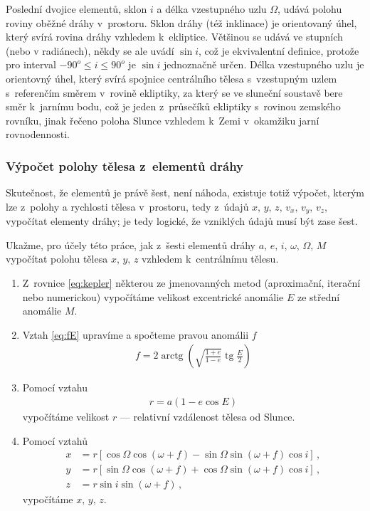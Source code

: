 \documentclass[A4paper, 12pt, oneside]{book}%
\DeclareMathOperator{\tg}{tg}
\DeclareMathOperator{\arctg}{arctg}
\begin{document}
Poslední dvojice elementů, sklon $i$ a délka vzestupného uzlu $\Omega$, udává polohu roviny oběžné dráhy v~prostoru. Sklon dráhy (též inklinace) je orientovaný úhel, který svírá rovina dráhy vzhledem k~ekliptice. Většinou se udává ve stupních (nebo v radiánech), někdy se ale uvádí $\sin i$, což je ekvivalentní definice, protože pro interval $-90^o\leq i \leq 90^o$ je $\sin i$ jednoznačně určen. Délka vzestupného uzlu je orientovný úhel, který svírá spojnice centrálního tělesa s~vzestupným uzlem s~referenčím směrem v~rovině ekliptiky, za který se ve sluneční soustavě bere směr k~jarnímu bodu, což je jeden z~průsečíků ekliptiky s~rovinou zemského rovníku, jinak řečeno poloha Slunce vzhledem k~Zemi v~okamžiku jarní rovnodennosti.

\subsubsection{Výpočet polohy tělesa z~elementů dráhy}
Skutečnost, že elementů je právě šest, není náhoda, existuje totiž výpočet, kterým lze z~polohy a rychlosti tělesa v~prostoru, tedy z~údajů $x,\, y,\, z,\, v_x,\, v_y,\, v_z$, vypočítat elementy dráhy; je tedy logické, že vzniklých údajů musí být zase šest. 

Ukažme, pro účely této práce, jak z~šesti elementů dráhy $a,\,e,\,i,\,\omega,\,\Omega,\,M$ vypočítat polohu tělesa $x,\, y,\, z$ vzhledem k~centrálnímu tělesu.

\begin{enumerate}[label=\arabic*.]
	\item Z~rovnice \eqref{eq:kepler} některou ze jmenovanných metod (aproximační, iterační nebo numerickou) vypočítáme velikost excentrické anomálie $E$ ze střední anomálie $M$.
	\item Vztah \eqref{eq:fE} upravíme a spočteme pravou anomálii $f$
		\begin{align}
			f = 2\arctg\left(\sqrt{\frac{1+e}{1-e}}\tg \frac{E}{2}\right)
		\end{align}
	\item Pomocí vztahu 
		\begin{align}
			r=a(1-e\cos E)
		\end{align}
		vypočítáme velikost $r$ --- relativní vzdálenost tělesa od Slunce.
	\item Pomocí vztahů
		\begin{align}
			x&=r\left[\cos\Omega\cos(\omega+f)-\sin\Omega\sin(\omega+f)\cos i\right]\,, \\
			y&=r\left[\sin\Omega\cos(\omega+f)+\cos\Omega\sin(\omega+f)\cos i\right]\,, \\
			z&=r\sin i\sin(\omega+f)\,,
		\end{align}
		vypočítáme $x,\,y,\,z$.
\end{enumerate}
\end{document}
